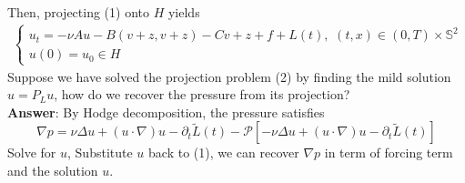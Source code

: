 \documentclass[xcolor=dvipsnames,leqno]{beamer}
\begin{document}
\begin{frame}
Then, projecting (1) onto $H$ yields 
\begin{align*}
	\begin{cases}
	u_t=-\nu Au-B(v+z,v+z)-Cv+z+f+ L(t),\,\,(t, x)\in (0, T)\times\mathbb{S}^2 \\
		u(0)=u_0\in H
	\end{cases}
\end{align*}
Suppose we have solved the projection problem (2) by finding the mild solution $u=P_L u$, how do we recover the pressure from its projection?\\
\vspace{1cm}
\textbf{Answer}: By Hodge decomposition, the pressure satisfies
\[
	\nabla p=\nu\Delta u+(u\cdot\nabla)u-\partial_t \tilde{L}(t)-\mathcal{P}[-\nu\Delta u+(u\cdot\nabla)u-\partial_t \tilde{L}(t)]
\]
Solve for $u$, Substitute $u$ back to (1), we can recover $\nabla p$ in term of forcing term and the solution $u$.
\end{frame}
     
\end{document}
